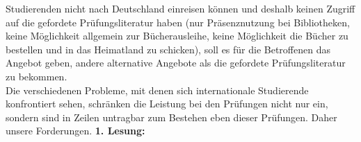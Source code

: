             Studierenden nicht nach Deutschland einreisen können und deshalb keinen Zugriff auf die gefordete
            Prüfungsliteratur haben (nur Präsenznutzung bei Bibliotheken, keine Möglichkeit allgemein zur
            Bücherausleihe, keine Möglichkeit die Bücher zu bestellen und in das Heimatland zu schicken), soll
            es für die Betroffenen das Angebot geben, andere alternative Angebote als die gefordete
            Prüfungsliteratur zu bekommen.\\
            Die verschiedenen Probleme, mit denen sich internationale Studierende konfrontiert sehen,
            schränken die Leistung bei den Prüfungen nicht nur ein, sondern sind in Zeilen untragbar zum
            Bestehen eben dieser Prüfungen. Daher unsere Forderungen.
            \textbf{1. Lesung:}
            \ul{}

